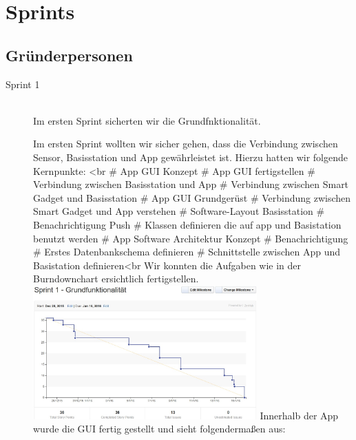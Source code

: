 \section{Sprints}
\subsection{Gründerpersonen}
\begin{description}

	\item [Sprint 1] \hfill \\
	Im ersten Sprint sicherten wir die Grundfnktionalität. 
		\begin{description}
			Im ersten Sprint wollten wir sicher gehen, dass die Verbindung zwischen Sensor, Basisstation und App gewährleistet ist. Hierzu hatten wir folgende Kernpunkte: <br\>
# App GUI Konzept 
# App GUI fertigstellen
# Verbindung zwischen Basisstation und App
# Verbindung zwischen Smart Gadget und Basisstation
# App GUI Grundgerüst
# Verbindung zwischen Smart Gadget und App verstehen
# Software-Layout Basisstation
# Benachrichtigung Push
# Klassen definieren die auf app und Basistation benutzt werden
# App Software Architektur Konzept
# Benachrichtigung
# Erstes Datenbankschema definieren
# Schnittstelle zwischen App und Basistation definieren<br\>
Wir konnten die Aufgaben wie in der Burndownchart ersichtlich fertigstellen.
\includegraphics[width=0.7\textwidth]{burndown_sprint1.jpg}
Innerhalb der App wurde die GUI fertig gestellt und sieht folgendermaßen aus:

\end{description}
\end{description}
